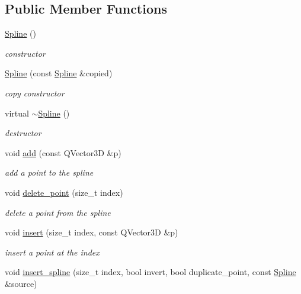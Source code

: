 \subsection*{Public Member Functions}
\begin{DoxyCompactItemize}
\item 
\hyperlink{classShipCAD_1_1Spline_a7ad84ea604562c7c9cb309b4e78e25c5}{Spline} ()
\begin{DoxyCompactList}\small\item\em constructor \end{DoxyCompactList}\item 
\hyperlink{classShipCAD_1_1Spline_a891b0c893b8124dca341680076854bff}{Spline} (const \hyperlink{classShipCAD_1_1Spline}{Spline} \&copied)
\begin{DoxyCompactList}\small\item\em copy constructor \end{DoxyCompactList}\item 
virtual \hyperlink{classShipCAD_1_1Spline_a20cddb0145346150b4ca30b63ef47c9b}{$\sim$\-Spline} ()
\begin{DoxyCompactList}\small\item\em destructor \end{DoxyCompactList}\item 
void \hyperlink{classShipCAD_1_1Spline_ac3d9f4514573be91b316413bf062791a}{add} (const Q\-Vector3\-D \&p)
\begin{DoxyCompactList}\small\item\em add a point to the spline \end{DoxyCompactList}\item 
void \hyperlink{classShipCAD_1_1Spline_a120c5530571f138daad61426053220f3}{delete\-\_\-point} (size\-\_\-t index)
\begin{DoxyCompactList}\small\item\em delete a point from the spline \end{DoxyCompactList}\item 
void \hyperlink{classShipCAD_1_1Spline_aa1ea6446e0b59d5cce88580242cd25b6}{insert} (size\-\_\-t index, const Q\-Vector3\-D \&p)
\begin{DoxyCompactList}\small\item\em insert a point at the index \end{DoxyCompactList}\item 
void \hyperlink{classShipCAD_1_1Spline_aa8e588b92d23c74bb6ec120624b49e54}{insert\-\_\-spline} (size\-\_\-t index, bool invert, bool duplicate\-\_\-point, const \hyperlink{classShipCAD_1_1Spline}{Spline} \&source)

\end{DoxyCompactItemize}
